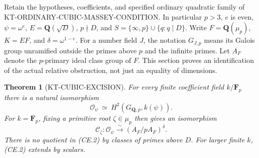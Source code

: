 \documentclass[11pt,a4paper]{article}
\newtheorem{theorem}{Theorem}[section]
\theoremstyle{definition}
\begin{document}
Retain the hypotheses, coefficients, and specified ordinary quadratic
family of KT-ORDINARY-CUBIC-MASSEY-CONDITION.  In particular \(p>3\),
\(e\) is even, \(\psi=\omega^e\), \(E=\mathbf Q(\sqrt D)\),
\(p\nmid D\), and
\(S=\{\infty,p\}\cup\{q:q\mid D\}\).
Write \(F=\mathbf Q(\mu_p)\), \(K=EF\), and
\(\delta=\omega^{1-e}\).  For a number field \(J\), the notation
\(G_{J,p}\) means its Galois group unramified outside the primes above
\(p\) and the infinite primes.  Let \(A_F\) denote the \(p\)-primary
ideal class group of \(F\).  This section proves an identification of
the actual relative obstruction, not just an equality of dimensions.

\begin{theorem}[KT-CUBIC-EXCISION]
For every finite coefficient field \(k/\mathbf F_p\) there is a
natural isomorphism
\[
 \mathcal O_\psi\ \simeq\ H^2(G_{\mathbf Q,p},k(\psi)).
                                                        \tag{CE.1}
\]
For \(k=\mathbf F_p\), fixing a primitive root \(\zeta\in\mu_p\)
then gives an isomorphism
\[
 \mathcal C_\zeta:\mathcal O_\psi
      \xrightarrow{\ \sim\ }(A_F/pA_F)^{\delta}.
                                                        \tag{CE.2}
\]
There is no quotient in (CE.2) by classes of primes above \(D\).
For larger finite \(k\), (CE.2) extends by scalars.
\end{theorem}
\end{document}
